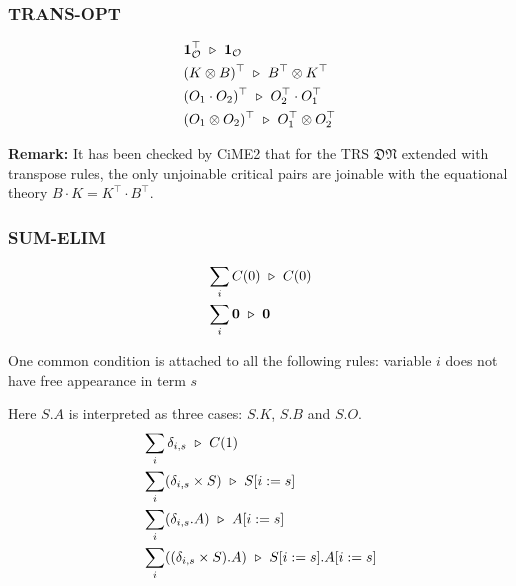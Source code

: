 \subsubsection*{\textsf{TRANS-OPT}}
\begin{align*}
  & \mathbf{1}_\mathcal{O}^\top \ \triangleright\  \mathbf{1}_\mathcal{O} \\
  & (K \otimes B)^\top \ \triangleright\  B^\top \otimes K^\top \\
  & (O_1 \cdot O_2)^\top \ \triangleright\  O_2^\top \cdot O_1^\top \\
  & (O_1 \otimes O_2)^\top \ \triangleright\  O_1^\top \otimes O_2^\top
\end{align*}

\textbf{Remark:} It has been checked by CiME2 that for the TRS $\mathfrak{DN}$ extended with transpose rules, the only unjoinable critical pairs are joinable with the equational theory $B\cdot K = K^\top \cdot B^\top$.


\subsubsection*{\textsf{SUM-ELIM}}

\begin{align*}
  & \sum_i C(0) \ \triangleright\  C(0) \\
  & \sum_i \mathbf{0} \ \triangleright\  \mathbf{0}
\end{align*}

One common condition is attached to all the following rules: variable $i$ does not have free appearance in term $s$

Here $S.A$ is interpreted as three cases: $S.K$, $S.B$ and $S.O$.
\begin{align*}
  & \sum_i \delta_{i, s} \ \triangleright\  C(1) \\
  & \sum_i (\delta_{i, s} \times S) \ \triangleright\  S[i:=s] \\
  & \sum_i (\delta_{i, s}.A) \ \triangleright\  A[i:=s] \\
  & \sum_i ((\delta_{i, s} \times S).A) \ \triangleright\  S[i:=s].A[i:=s] \\
\end{align*}




